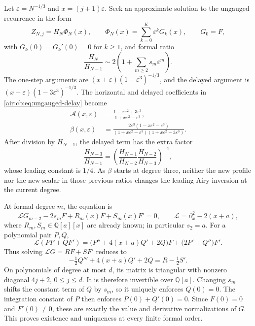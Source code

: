 \documentclass[11pt,letterpaper]{article}
\numberwithin{equation}{section}
\theoremstyle{remark}
\newcommand{\Q}{\mathbb{Q}}
\newcommand{\eps}{\varepsilon}
\begin{document}
Let $\eps=N^{-1/3}$ and $x=(j+1)\eps$. Seek an approximate solution to the
ungauged recurrence in the form
\begin{equation}\label{air:cb:eq:formal-ansatz}
Z_{N,j}=H_N\Phi_N(x),\qquad
\Phi_N(x)=\sum_{k=0}^{K}\eps^kG_k(x),\qquad G_0=F,
\end{equation}
with $G_k(0)=G_k'(0)=0$ for $k\ge1$, and formal ratio
\begin{equation}\label{air:cb:eq:formal-ratio}
\frac{H_N}{H_{N-1}}\sim2\left(1+\sum_{m\ge2}s_m\eps^m\right).
\end{equation}
The one-step arguments are $(x\pm\eps)(1-\eps^3)^{-1/3}$, and the delayed
argument is $(x-\eps)(1-3\eps^3)^{-1/3}$. The horizontal and delayed
coefficients in \eqref{air:cb:eq:ungauged-delay} become
\begin{equation}\label{air:cb:eq:formal-coeffs}
\begin{aligned}
\mathcal A(x,\eps)&=\frac{1-x\eps^2+3\eps^3}{1+x\eps^2-\eps^3},\\
\beta(x,\eps)&=\frac{2\eps^3(1-x\eps^2-\eps^3)}
{(1+x\eps^2-\eps^3)(1+x\eps^2-3\eps^3)}.
\end{aligned}
\end{equation}
After division by $H_{N-1}$, the delayed term has the extra factor
\[
\frac{H_{N-3}}{H_{N-1}}=
\left(\frac{H_{N-1}}{H_{N-2}}\frac{H_{N-2}}{H_{N-3}}\right)^{-1},
\]
whose leading constant is $1/4$. As $\beta$ starts at degree three, neither
the new profile nor the new scalar in those previous ratios changes the
leading Airy inversion at the current degree.

At formal degree $m$, the equation is
\begin{equation}\label{air:cb:eq:formal-equation}
\mathcal LG_{m-2}-2s_mF+R_m(x)F+S_m(x)F'=0,\qquad
\mathcal L=\partial_x^2-2(x+a),
\end{equation}
where $R_m,S_m\in\Q[a][x]$ are already known; in particular $s_2=a$.
For a polynomial pair $P,Q$,
\[
\mathcal L(PF+QF')=
\bigl(P''+4(x+a)Q'+2Q\bigr)F+\bigl(2P'+Q''\bigr)F'.
\]
Thus solving $\mathcal LG=RF+SF'$ reduces to
\begin{equation}\label{air:cb:eq:triangular}
-\tfrac12Q'''+4(x+a)Q'+2Q=R-\tfrac12S'.
\end{equation}
On polynomials of degree at most $d$, its matrix is triangular with nonzero
diagonal $4j+2$, $0\le j\le d$. It is therefore invertible over $\Q[a]$.
Changing $s_m$ shifts the constant term of $Q$ by $s_m$, so it uniquely
enforces $Q(0)=0$. The integration constant of $P$ then enforces
$P(0)+Q'(0)=0$. Since $F(0)=0$ and $F'(0)\ne0$, these are exactly the
value and derivative normalizations of $G$.
This proves existence and uniqueness at every finite formal order.
\end{document}
